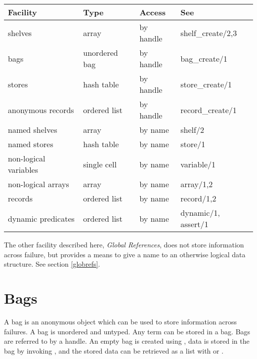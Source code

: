 \vspace{2mm}
\begin{center}
\begin{tabular}{l|l l l}
Facility & Type & Access & See \\
\hline
shelves&                array&          by handle&      shelf_create/2,3 \\
bags&                   unordered bag&  by handle&      bag_create/1 \\
stores&                 hash table&     by handle&      store_create/1 \\
anonymous records&      ordered list&   by handle&      record_create/1 \\
named shelves&          array&          by name&        shelf/2 \\
named stores&           hash table&     by name&        store/1 \\
non-logical variables&  single cell&    by name&        variable/1 \\
non-logical arrays&     array&          by name&        array/1,2 \\
records&                ordered list&   by name&        record/1,2 \\
dynamic predicates&     ordered list&   by name&        dynamic/1, assert/1 \\
\end{tabular}
\end{center}
\vspace{2mm}

The other facility described here, \emph{Global References}, does not store
information across failure, but provides a means to give a name to
an otherwise logical data structure. See section \ref{globrefs}.


\section{Bags}

A bag is an anonymous object which can be used to store
information across failures.
A bag is unordered and untyped. Any {\eclipse} term can be stored in a bag.
Bags are referred to by a handle.
An empty bag is created using
,
data is stored in the bag by invoking
,
and the stored data can be retrieved as a list with
 or
.

